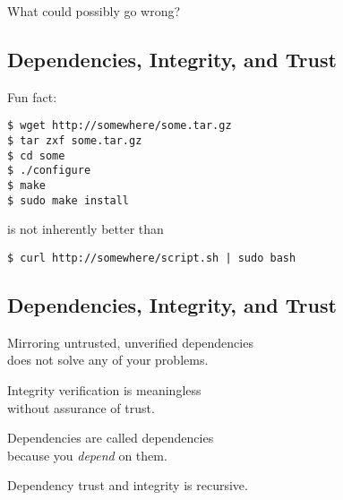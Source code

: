 \documentclass[xga]{xdvislides}
\begin{document}
What could possibly go wrong?

\subsection{Dependencies, Integrity, and Trust}
Fun fact: \\

\begin{verbatim}
$ wget http://somewhere/some.tar.gz
$ tar zxf some.tar.gz
$ cd some
$ ./configure
$ make
$ sudo make install
\end{verbatim}
\vspace{.5in}
is not inherently better than \\

\begin{verbatim}
$ curl http://somewhere/script.sh | sudo bash
\end{verbatim}

\subsection{Dependencies, Integrity, and Trust}
\begin{center}
Mirroring untrusted, unverified dependencies\\
does not solve any of your problems. \\
\vspace{.5in}

Integrity verification is meaningless \\
without assurance of trust. \\
\vspace{.5in}

Dependencies are called dependencies \\
because you {\em depend} on them. \\
\vspace{.5in}

Dependency trust and integrity is recursive. \\
\vspace{.5in}
\end{center}
\end{document}

